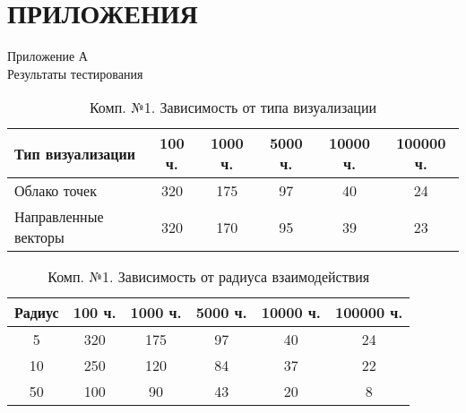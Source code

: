 \section*{ПРИЛОЖЕНИЯ}
\begin{center}
  Приложение А \\
  Результаты тестирования
\end{center}


\renewcommand{\thetable}{A.\arabic{table}}
\setcounter{table}{0} 

\begin{table}[h!]
  \captionsetup{width=0.9\textwidth}
  \caption{\label{tab:fst:simple}Комп. №1. Зависимость от типа визуализации}
  \begin{center}
    \begin{tabular}{|l|c|c|c|c|c|}
      \hline
      Тип визуализации & 100 ч. & 1000 ч. & 5000 ч. & 10000 ч. & 100000 ч. \\
      \hline
      Облако точек & 320 & 175 & 97 & 40 & 24 \\
      Направленные векторы & 320 & 170 & 95 & 39 & 23 \\
      \hline
    \end{tabular}
  \end{center}
\end{table}

\begin{table}[h!]
  \captionsetup{width=0.7\textwidth}
  \caption{\label{tab:fst:radius}Комп. №1. Зависимость от радиуса взаимодействия}
  \begin{center}
    \begin{tabular}{|c|c|c|c|c|c|}
      \hline
      Радиус & 100 ч. & 1000 ч. & 5000 ч. & 10000 ч. & 100000 ч. \\
      \hline
      5 & 320 & 175 & 97 & 40 & 24 \\
      10 & 250 & 120 & 84 & 37 & 22 \\
      50 & 100 & 90 & 43 & 20 & 8 \\
      \hline
    \end{tabular}
  \end{center}
\end{table}

